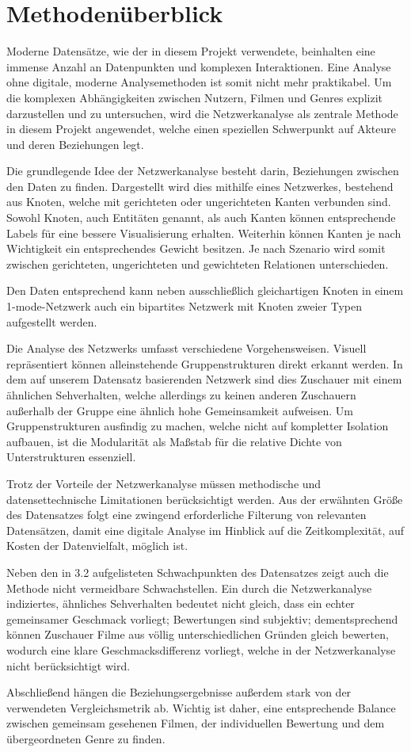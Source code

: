 \section{Methodenüberblick}

Moderne Datensätze, wie der in diesem Projekt verwendete, beinhalten eine immense Anzahl an Datenpunkten und komplexen Interaktionen.
Eine Analyse ohne digitale, moderne Analysemethoden ist somit nicht mehr praktikabel.
Um die komplexen Abhängigkeiten zwischen Nutzern, Filmen und Genres explizit darzustellen und zu untersuchen, wird die Netzwerkanalyse als zentrale Methode in diesem Projekt angewendet, welche einen speziellen Schwerpunkt auf Akteure und deren Beziehungen legt. \parencite{KnowledgeSolutions2017}

Die grundlegende Idee der Netzwerkanalyse besteht darin, Beziehungen zwischen den Daten zu finden.
Dargestellt wird dies mithilfe eines Netzwerkes, bestehend aus Knoten, welche mit gerichteten oder ungerichteten Kanten verbunden sind.
Sowohl Knoten, auch Entitäten genannt, als auch Kanten können entsprechende Labels für eine bessere Visualisierung erhalten.
Weiterhin können Kanten je nach Wichtigkeit ein entsprechendes Gewicht besitzen.
Je nach Szenario wird somit zwischen gerichteten, ungerichteten und gewichteten Relationen unterschieden.

Den Daten entsprechend kann neben ausschließlich gleichartigen Knoten in einem 1-mode-Netzwerk auch ein bipartites Netzwerk mit Knoten zweier Typen aufgestellt werden.

Die Analyse des Netzwerks umfasst verschiedene Vorgehensweisen.
Visuell repräsentiert können alleinstehende Gruppenstrukturen direkt erkannt werden. 
In dem auf unserem Datensatz basierenden Netzwerk sind dies Zuschauer mit einem ähnlichen Sehverhalten, welche allerdings zu keinen anderen Zuschauern außerhalb der Gruppe eine ähnlich hohe Gemeinsamkeit aufweisen.
Um Gruppenstrukturen ausfindig zu machen, welche nicht auf kompletter Isolation aufbauen, ist die Modularität als Maßstab für die relative Dichte von Unterstrukturen essenziell.

Trotz der Vorteile der Netzwerkanalyse müssen methodische und datensettechnische Limitationen berücksichtigt werden.
Aus der erwähnten Größe des Datensatzes folgt eine zwingend erforderliche Filterung von relevanten Datensätzen, damit eine digitale Analyse im Hinblick auf die Zeitkomplexität, auf Kosten der Datenvielfalt, möglich ist.

Neben den in 3.2 aufgelisteten Schwachpunkten des Datensatzes zeigt auch die Methode nicht vermeidbare Schwachstellen.
Ein durch die Netzwerkanalyse indiziertes, ähnliches Sehverhalten bedeutet nicht gleich, dass ein echter gemeinsamer Geschmack vorliegt;
Bewertungen sind subjektiv; dementsprechend können Zuschauer Filme aus völlig unterschiedlichen Gründen gleich bewerten, wodurch eine klare Geschmacksdifferenz vorliegt, welche in der Netzwerkanalyse nicht berücksichtigt wird.

Abschließend hängen die Beziehungsergebnisse außerdem stark von der verwendeten Vergleichsmetrik ab. 
Wichtig ist daher, eine entsprechende Balance zwischen gemeinsam gesehenen Filmen, der individuellen Bewertung und dem übergeordneten Genre zu finden.
